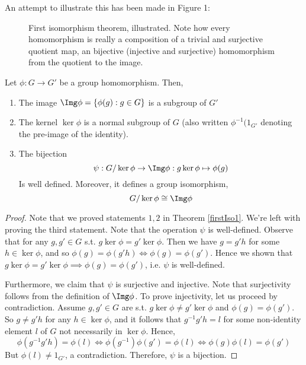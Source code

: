 An attempt to illustrate this has been made in Figure 1:

\begin{center}
\end{center}

\begin{figure}[htpb]
    \centering
    \caption{First isomorphism theorem, illustrated. Note how every homomorphism is really
    a composition of a trivial and surjective quotient map, an bijective (injective and
    surjective) homomorphism from the quotient to the image.} 
    \label{fig:isomorphism-theorem}
\end{figure}


\begin{theorem} 
  Let $\phi:G\to G'$ be a group homomorphism. Then,
  \begin{enumerate}
    \item The image $\Img\phi=\left\{ \phi(g) : g\in G \right\}$ is a subgroup of $G'$
    \item The kernel $\ker\phi$ is a normal subgroup of $G$ (also written
        $\phi^{-1}(1_{G'}$ denoting the pre-image of the identity).
    \item The bijection 
      \[\psi: G/\ker\phi\to\Img\phi : g \ker\phi\mapsto \phi(g)\]
      Is well defined. Moreover, it defines a group isomorphism,
      \[G/\ker\phi \cong \Img\phi\]
  \end{enumerate}
  \label{firstIso}
\end{theorem}
\begin{proof}
  Note that we proved statements $1,2$ in Theorem \ref{firstIso1}. We're left with proving
  the third statement. Note that the operation $\psi$ is well-defined. Observe that for
  any $g,g'\in G$ s.t. $g\ker\phi=g'\ker\phi$. Then we have $g=g'h$ for some
  $h\in\ker\phi$, and so $\phi(g)=\phi(g'h) \iff \phi(g)=\phi(g')$. Hence we shown that
  $g\ker\phi=g'\ker\phi \implies \phi(g)=\phi(g')$, i.e. $\psi$ is well-defined.

  Furthermore, we claim that $\psi$ is surjective and injective. Note that surjectivity
  follows from the definition of $\Img\phi$. To prove injectivity, let us proceed by
  contradiction. Assume $g,g'\in G$ are s.t. $g\ker\phi\neq g'\ker\phi$ and
  $\phi(g)=\phi(g')$. So $g\neq g'h$ for any $h\in\ker\phi$, and it follows that
  $g^{-1}g'h=l$ for some non-identity element $l$ of $G$ not necessarily in $\ker\phi$. Hence,
  \[\phi(g^{-1}g'h) = \phi(l) \iff \phi(g^{-1})\phi(g') = \phi(l) \iff
  \phi(g)\phi(l)=\phi(g')\]
  But $\phi(l)\neq 1_{G'}$, a contradiction. Therefore, $\psi$ is a bijection.
\end{proof}
